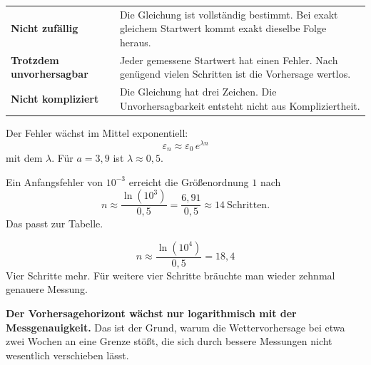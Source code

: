 \begin{merksatz}
\begin{center}
{\small
\renewcommand{\arraystretch}{1.55}
\begin{tabular}{@{}P{2.6cm}P{6.0cm}@{}}
\toprule
\textbf{Nicht zufällig} & Die Gleichung ist vollständig bestimmt. Bei exakt gleichem Startwert kommt exakt dieselbe Folge heraus.\\
\textbf{Trotzdem unvorhersagbar} & Jeder gemessene Startwert hat einen Fehler. Nach genügend vielen Schritten ist die Vorhersage wertlos.\\
\textbf{Nicht kompliziert} & Die Gleichung hat drei Zeichen. Die Unvorhersagbarkeit entsteht nicht aus Kompliziertheit.\\
\bottomrule
\end{tabular}}
\end{center}

Der Fehler wächst im Mittel exponentiell:
\[ \varepsilon_n \approx \varepsilon_0\,e^{\lambda n} \]
mit dem  $\lambda$. Für $a = 3{,}9$ ist $\lambda \approx 0{,}5$.

Ein Anfangsfehler von $10^{-3}$ erreicht die Größenordnung $1$ nach
\[ n \approx \frac{\ln(10^{3})}{0{,}5} = \frac{6{,}91}{0{,}5} \approx 14 \ \text{Schritten} . \]
Das passt zur Tabelle.

\[ n \approx \frac{\ln(10^{4})}{0{,}5} = 18{,}4 \]
Vier Schritte mehr. Für weitere vier Schritte bräuchte man wieder zehnmal genauere Messung.

\begin{center}
\begin{minipage}{0.9\textwidth}
\textbf{Der Vorhersagehorizont wächst nur logarithmisch mit der Messgenauigkeit.} Das ist der Grund, warum die Wettervorhersage bei etwa zwei Wochen an eine Grenze stößt, die sich durch bessere Messungen nicht wesentlich verschieben lässt.
\end{minipage}
\end{center}
\end{merksatz}

